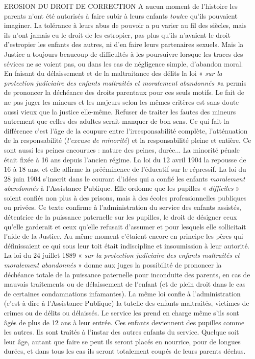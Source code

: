 EROSION DU DROIT DE CORRECTION
 A aucun moment de l'histoire les parents n'ont été autorisés à faire subir à leurs enfants \emph{tout}ce qu'ils pouvaient imaginer. La tolérance à leurs abus de pouvoir a pu varier au fil des siècles, mais ils n'ont jamais eu le droit de les estropier, pas plus qu'ils n'avaient le droit d'estropier les enfants des autres, ni d'en faire leurs partenaires sexuels. Mais la Justice a toujours beaucoup de difficultés à les poursuivre lorsque les traces des sévices ne se voient pas, ou dans les cas de négligence simple, d'abandon moral. En faisant du délaissement et de la maltraitance des délits la loi « \emph{sur la protection judiciaire des enfants maltraités et moralement abandonnés »}a permis de prononcer la déchéance des droits parentaux pour ces seuls motifs. 
 Le fait de ne pas juger les mineurs et les majeurs selon les mêmes critères est sans doute aussi vieux que la justice elle-même. Refuser de traiter les fautes des mineurs autrement que celles des adultes serait manquer de bon sens. Ce qui fait la différence c'est l'âge de la coupure entre l'irresponsabilité complète, l'atténuation de la responsabilité (\emph{l'excuse de minorité}) et la responsabilité pleine et entière. Ce sont aussi les peines encourues : nature des peines, durée... La minorité pénale était fixée à 16 ans depuis l'ancien régime. La loi du 12 avril 1904 la repousse de 16 à 18 ans, et elle affirme la prééminence de l'éducatif sur le répressif.
 La loi du 28 juin 1904 s'inscrit dans le courant d'idées qui a confié les enfants \emph{moralement abandonnés} à l'Assistance Publique. Elle ordonne que les pupilles « \emph{difficiles} » soient confiés non plus à des prisons, mais à des écoles professionnelles publiques ou privées. Ce texte confirme à l'administration du service des enfants assistés, détentrice de la puissance paternelle sur les pupilles, le droit de désigner ceux qu'elle garderait et ceux qu'elle refusait d'assumer et pour lesquels elle sollicitait l'aide de la Justice. Au même moment c'étaient encore en principe les pères qui définissaient ce qui sous leur toit était indiscipline et insoumission à leur autorité.
 La loi du 24 juillet 1889 « \emph{sur la protection judiciaire des enfants maltraités et moralement abandonnés} » donne aux juges la possibilité de prononcer la déchéance totale de la puissance paternelle pour inconduite des parents, en cas de mauvais traitements ou de délaissement de l'enfant (et de plein droit dans le cas de certaines condamnations infamantes). La même loi confie à l'administration (c'est-à-dire à l'Assistance Publique) la tutelle des enfants maltraités, victimes de crimes ou de délits ou délaissés. Le service les prend en charge même s'ils sont âgés de plus de 12 ans à leur entrée. Ces enfants deviennent des pupilles comme les autres. Ils sont traités à l'instar des autres enfants du service. Quelque soit leur âge, autant que faire se peut ils seront placés en nourrice, pour de longues durées, et dans tous les cas ils seront totalement coupés de leurs parents déchus.
